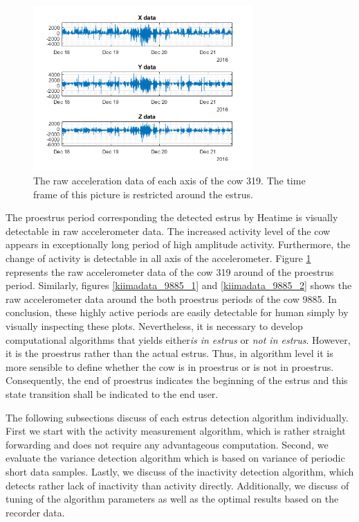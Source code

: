 \documentclass[english,12pt,a4paper,pdftex,elec,utf8]{aaltothesis}
\begin{document}
\begin{figure}[h]
\centering
\includegraphics[width = 0.75\textwidth]{figures/kiimadata_319.png}
\caption{The raw acceleration data of each axis of the cow 319. The time frame of this picture is restricted around the estrus.}
\label{kiimadata_319}
\end{figure}


The proestrus period corresponding the detected estrus by Heatime is visually detectable in raw accelerometer data. The increased activity level of the cow appears in exceptionally long period of high amplitude activity. Furthermore, the change of activity is detectable in all axis of the accelerometer. Figure \ref{kiimadata_319} represents the raw accelerometer data of the cow 319 around of the proestrus period. Similarly, figures \ref{kiimadata_9885_1} and \ref{kiimadata_9885_2} shows the raw accelerometer data around the both proestrus periods of the cow 9885. In conclusion, these highly active periods are easily detectable for human simply by visually inspecting these plots. Nevertheless, it is necessary to develop computational algorithms that yields either\textit{is in estrus} or \textit{not in estrus}. However, it is the proestrus rather than the actual estrus. Thus, in algorithm level it is more sensible to define whether the cow is in proestrus or is not in proestrus. Consequently, the end of proestrus indicates the beginning of the estrus and this state transition shall be indicated to the end user.


The following subsections discuss of each estrus detection algorithm individually. First we start with the activity measurement algorithm, which is rather straight forwarding and does not require any advantageous computation. Second, we evaluate the variance detection algorithm which is based on variance of periodic short data samples. Lastly, we discuss of the inactivity detection algorithm, which detects rather lack of inactivity than activity directly. Additionally, we discuss of tuning of the algorithm parameters as well as the optimal results based on the recorder data. 
\end{document}
